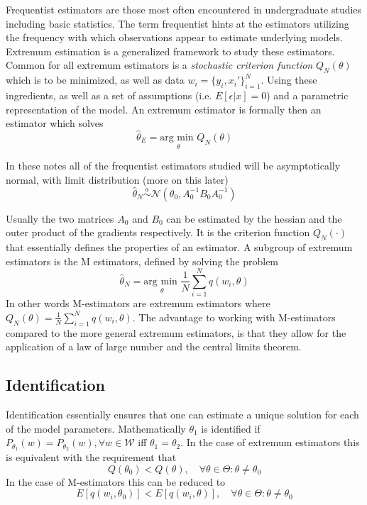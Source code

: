 Frequentist estimators are those most often encountered in undergraduate studies including basic statistics. The term frequentist hints at the estimators utilizing the frequency with which observations appear to estimate underlying models. Extremum estimation is a generalized framework to study these estimators. Common for all extremum estimators is a \textit{stochastic criterion function} $Q_N(\theta)$ which is to be minimized, as well as data $w_i = \{y_i, x_i'\}_{i = 1}^N$. Using these ingredients, as well as a set of assumptions (i.e. $E[\epsilon|x] = 0$) and a parametric representation of the model. An extremum estimator is formally then an estimator which solves
\begin{equation}
\hat{\theta}_{E} = \underset{\theta}{\textrm{arg min }}  Q_N(\theta)
\end{equation}

In these notes all of the frequentist estimators studied will be asymptotically normal, with limit distribution (more on this later)
\begin{equation}
\hat{\theta}_N \overset{a}{\sim} \mathcal{N}(\theta_0, A_0^{-1}B_0 A_0^{-1})
\end{equation}

Usually the two matrices $A_0$ and $B_0$ can be estimated by the hessian and the outer product of the gradients respectively. It is the criterion function $Q_N(\cdot)$ that essentially defines the properties of an estimator. A subgroup of extremum estimators is the M estimators, defined by solving the problem
\begin{equation}
\hat{\theta}_N = \underset{\theta}{\textrm{arg min }} \frac{1}{N} \sum_{i=1}^N q(w_i, \theta)
\end{equation}
In other words M-estimators are extremum estimators where $Q_N(\theta) = \frac{1}{N} \sum_{i=1}^N q(w_i , \theta)$. The advantage to working with M-estimators compared to the more general extremum estimators, is that they allow for the application of a law of large number and the central limits theorem.
\subsection{Identification}
Identification essentially ensures that one can estimate a unique solution for each of the model parameters. Mathematically $\theta_1$ is identified if $P_{\theta_1}(w) = P_{\theta_2}(w), \forall w \in \mathcal{W}$ iff $\theta_1 = \theta_2$. In the case of extremum estimators this is equivalent with the requirement that
\begin{equation}
Q(\theta_0) < Q(\theta), \quad \forall \theta \in \Theta : \theta \neq \theta_0
\end{equation}
In the case of M-estimators this can be reduced to
\begin{equation*}
E[q(w_i,\theta_0)] < E[q(w_i, \theta)], \quad \forall \theta \in \Theta : \theta \neq \theta_0
\end{equation*}


